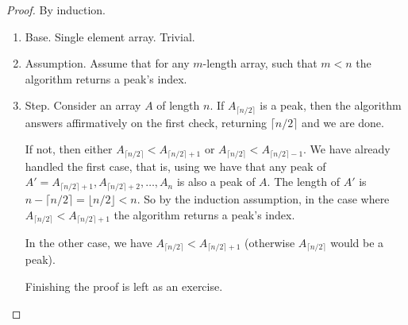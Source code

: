 \begin{proof}
  By induction. 
\begin{enumerate}
  \item Base. Single element array. Trivial. 
  \item Assumption. Assume that for any $m$-length array, such that $m<n$ the algorithm returns a peak's index. 
  \item Step. Consider an array $A$ of length $n$. If $A_{\lceil n/2 \rceil}$ is a peak, then the algorithm answers affirmatively on the first check, returning $\lceil n/2 \rceil$ and we are done.

  If not, then either $A_{\lceil n/2 \rceil} < A_{\lceil n/2 \rceil + 1}$ or $A_{\lceil n/2 \rceil} < A_{\lceil n/2 \rceil - 1}$. We have already handled the first case, that is, using  we have that any peak of $A' = A_{\lceil n/2 \rceil + 1}, A_{\lceil n/2 \rceil + 2}, \dots, A_n$ is also a peak of $A$. The length of $A'$ is $ n - \lceil n/2 \rceil  = \lfloor n/2 \rfloor < n$. So by the induction assumption, in the case where $A_{\lceil n/2 \rceil} < A_{\lceil n/2 \rceil + 1}$ the algorithm returns a peak's index. 


  In the other case, we have $A_{\lceil n/2 \rceil} < A_{\lceil n/2 \rceil + 1}$ (otherwise $A_{\lceil n/2 \rceil}$ would be a peak). 

  Finishing the proof is left as an exercise.
\end{enumerate}

\end{proof}


